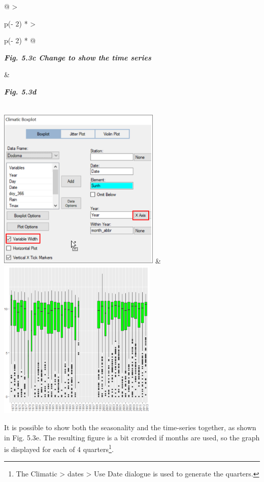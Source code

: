 \documentclass[
  letterpaper,
  DIV=11,
  numbers=noendperiod]{scrreprt}
\begin{document}
\begin{longtable}[]{@{}
  >{\raggedright\arraybackslash}p{(\columnwidth - 2\tabcolsep) * }
  >{\raggedright\arraybackslash}p{(\columnwidth - 2\tabcolsep) * }@{}}
\toprule\noalign{}
\begin{minipage}[b]{\linewidth}\raggedright
\textbf{\emph{Fig. 5.3c Change to show the time series}}
\end{minipage} & \begin{minipage}[b]{\linewidth}\raggedright
\textbf{\emph{Fig. 5.3d}}
\end{minipage} \\
\midrule\noalign{}
\endhead
\bottomrule\noalign{}
\endlastfoot
\includegraphics[width=3.05689in,height=3.07681in]{figures/Fig5.3c.png}
&
\includegraphics[width=2.9791in,height=3.0135in]{figures/Fig5.3d.png} \\
\end{longtable}

It is possible to show both the seasonality and the time-series
together, as shown in Fig. 5.3e. The resulting figure is a bit crowded
if months are used, so the graph is displayed for each of 4
quarters\footnote{The Climatic \textgreater{} dates \textgreater{} Use
  Date dialogue is used to generate the quarters.}.
\end{document}
